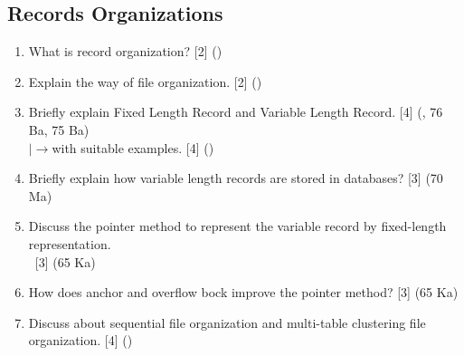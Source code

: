 \documentclass[12pt]{article}
\newcommand{\lb}{\\$\left|\rightarrow\right.$}
\newcommand{\enter}{\\\textcolor{white}{1}}
\begin{document}
    \subsection{Records Organizations}
		\begin{enumerate}[noitemsep, topsep=0pt]
			\item What is record organization? \hfill [2] ()
			
			\item Explain the way of file organization. \hfill [2] ()
			
			\item Briefly explain Fixed Length Record and Variable Length Record. \hfill [4] (, 76 Ba, 75 Ba)
			\lb with suitable examples. \hfill [4] ()
			
			\item Briefly explain how variable length records are stored in databases? \hfill [3] (70 Ma)
			
			\item Discuss the pointer method to represent the variable record by fixed-length representation.
			\enter\hfill [3] (65 Ka)
			
			\item How does anchor and overflow bock improve the pointer method? \hfill [3] (65 Ka)
			
			\item Discuss about sequential file organization and multi-table clustering file organization. \hfill [4] ()
		\end{enumerate}		    
    
\end{document}
